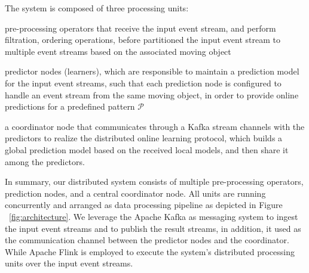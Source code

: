 The system is composed of three processing units:   \begin{enumerate*}[(i)]
	\item pre-processing operators that receive the input event stream, and perform filtration, ordering operations, before partitioned the input event stream to multiple event streams based on the associated moving object 
	\item predictor nodes (learners), which are responsible to maintain a prediction model for the input event streams, such that each prediction node is configured to handle an event stream from the same moving object, in order to provide online predictions for a predefined pattern $\mathcal{P}$  
	\item a coordinator node that communicates through a Kafka stream channels with the predictors to realize the distributed online learning protocol, which builds a global prediction model based on the received local models, and then share it among the predictors.
\end{enumerate*}

\par In summary, our distributed system consists of multiple pre-processing operators, prediction nodes,  and a central coordinator node. All units are running concurrently and arranged as data processing pipeline as depicted in Figure ~\ref{fig:architecture}. We leverage the Apache Kafka as messaging system to ingest the input event streams and to publish the result streams, in addition, it used as the communication channel between the predictor nodes and the coordinator. While Apache Flink is employed to execute the system's distributed processing units over the input event streams. 
